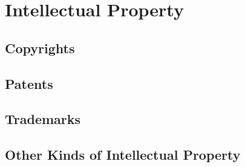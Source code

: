 \chapter{Intellectual Property}







\section{Copyrights}



\begin{questions}

\end{questions}




\begin{questions}

\end{questions}





\begin{questions}

\end{questions}




\begin{questions}

\end{questions}



\section{Patents}





\begin{questions}

\end{questions}



\section{Trademarks}




\begin{questions}

\end{questions}



\section{Other Kinds of Intellectual Property}



\begin{questions}

\end{questions}
